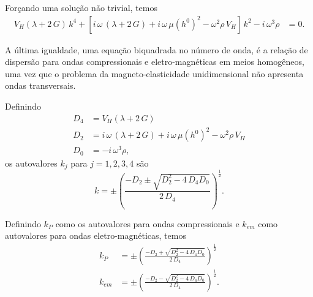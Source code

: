 
For\c{c}ando uma solu\c{c}\~ao n\~ao trivial, temos\\
\begin{align*}
V_H(\lambda+2\,G)\,k^4+\left[i\,\omega\,(\lambda+2\,G)+i\,\omega\,\mu(h^0)^2-\omega^2\rho\,V_H\right]\,k^2-i\,\omega^3\rho&=0.    
\end{align*}

A \'ultima igualdade, uma equa\c{c}\~ao biquadrada no n\'umero de onda, \'e a rela\c{c}\~ao de dispers\~ao para ondas compressionais e eletro-magn\'eticas em meios homog\^eneos, uma vez que o problema da magneto-elasticidade unidimensional n\~ao apresenta ondas transversais.

Definindo 
\begin{align*}
D_4&=V_H(\lambda+2\,G)\\
D_2&=i\,\omega\,(\lambda+2\,G)+i\,\omega\,\mu(h^0)^2-\omega^2\rho\,V_H\\
D_0&=-i\,\omega^3\rho,
\end{align*}
os autovalores $k_j$ para $j=1,2,3,4$ s\~ao
\begin{equation*}
k=\pm\left(\frac{-D_2\pm\sqrt{D_2^2-4\,D_4D_0}}{2\,D_4}\right)^\frac{1}{2}.
\end{equation*}

Definindo $k_{P}$ como os autovalores para ondas compressionais e $k_{em}$ como autovalores para ondas eletro-magn\'eticas, temos
\begin{align*}
k_{P}&=\pm\left(\frac{-D_2+\sqrt{D_2^2-4\,D_4D_0}}{2\,D_4}\right)^\frac{1}{2}\\
k_{em}&=\pm\left(\frac{-D_2-\sqrt{D_2^2-4\,D_4D_0}}{2\,D_4}\right)^\frac{1}{2}.
\end{align*}


